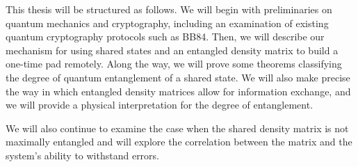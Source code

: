 This thesis will be structured as follows.  We will begin with preliminaries on quantum mechanics and cryptography, including an examination of existing quantum cryptography protocols such as BB84. Then, we will describe our mechanism for using shared states and an entangled density matrix to build a one-time pad remotely. Along the way, we will prove some theorems classifying the degree of quantum entanglement of a shared state. We will also make precise the way in which entangled density matrices allow for information exchange, and we will provide a physical interpretation for the degree of entanglement. 

We will also continue to examine the case when the shared density matrix is not maximally entangled and will explore the correlation between the matrix and the system's ability to withstand errors. 
